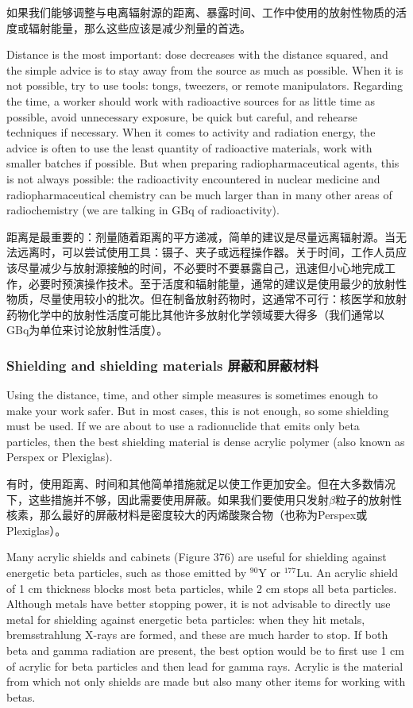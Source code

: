 \documentclass[dvipsnames, svgnames,a4paper,11pt]{article}
\begin{document}
如果我们能够调整与电离辐射源的距离、暴露时间、工作中使用的放射性物质的活度或辐射能量，那么这些应该是减少剂量的首选。  

Distance is the most important: dose decreases with the distance squared, and the simple advice is to stay away from the source as much as possible. When it is not possible, try to use tools: tongs, tweezers, or remote manipulators. Regarding the time, a worker should work with radioactive sources for as little time as possible, avoid unnecessary exposure, be quick but careful, and rehearse techniques if necessary. When it comes to activity and radiation energy, the advice is often to use the least quantity of radioactive materials, work with smaller batches if possible. But when preparing radiopharmaceutical agents, this is not always possible: the radioactivity encountered in nuclear medicine and radiopharmaceutical chemistry can be much larger than in many other areas of radiochemistry (we are talking in GBq of radioactivity).  

距离是最重要的：剂量随着距离的平方递减，简单的建议是尽量远离辐射源。当无法远离时，可以尝试使用工具：镊子、夹子或远程操作器。关于时间，工作人员应该尽量减少与放射源接触的时间，不必要时不要暴露自己，迅速但小心地完成工作，必要时预演操作技术。至于活度和辐射能量，通常的建议是使用最少的放射性物质，尽量使用较小的批次。但在制备放射药物时，这通常不可行：核医学和放射药物化学中的放射性活度可能比其他许多放射化学领域要大得多（我们通常以GBq为单位来讨论放射性活度）。  

\subsubsection{Shielding and shielding materials 屏蔽和屏蔽材料}  
Using the distance, time, and other simple measures is sometimes enough to make your work safer. But in most cases, this is not enough, so some shielding must be used. If we are about to use a radionuclide that emits only beta particles, then the best shielding material is dense acrylic polymer (also known as Perspex or Plexiglas).

有时，使用距离、时间和其他简单措施就足以使工作更加安全。但在大多数情况下，这些措施并不够，因此需要使用屏蔽。如果我们要使用只发射$\beta$粒子的放射性核素，那么最好的屏蔽材料是密度较大的丙烯酸聚合物（也称为Perspex或Plexiglas）。

Many acrylic shields and cabinets (Figure 376) are useful for shielding against energetic beta particles, such as those emitted by \(\mathrm{^{90}Y}\) or \(\mathrm{^{177}Lu}\). An acrylic shield of 1 cm thickness blocks most beta particles, while 2 cm stops all beta particles. Although metals have better stopping power, it is not advisable to directly use metal for shielding against energetic beta particles: when they hit metals, bremsstrahlung X-rays are formed, and these are much harder to stop. If both beta and gamma radiation are present, the best option would be to first use 1 cm of acrylic for beta particles and then lead for gamma rays. Acrylic is the material from which not only shields are made but also many other items for working with betas.
\end{document}
